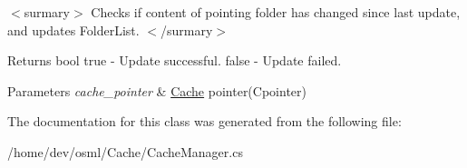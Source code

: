$<$surmary$>$ Checks if content of pointing folder has changed since last update, and updates Folder\+List. $<$/surmary$>$ \begin{DoxyReturn}{Returns}
bool true -\/ Update successful. false -\/ Update failed. 
\end{DoxyReturn}

\begin{DoxyParams}{Parameters}
{\em cache\+\_\+pointer} & \mbox{\hyperlink{namespaceOSML_1_1Cache}{Cache}} pointer(\+Cpointer)\\
\hline
\end{DoxyParams}


The documentation for this class was generated from the following file\+:\begin{DoxyCompactItemize}
\item 
/home/dev/osml/\+Cache/Cache\+Manager.\+cs\end{DoxyCompactItemize}
